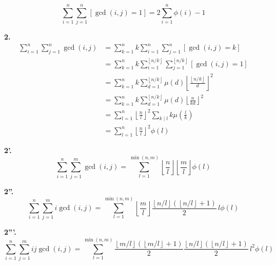 \[
\sum_{i=1}^{n} \sum_{j=1}^{n} [\gcd(i,j)=1]
=
2\sum_{i=1}^{n}\phi(i)-1
\]

\noindent \textbf{2.}
\begin{align*}
\sum_{i=1}^{n} \sum_{j=1}^{n} \gcd(i,j)
&=
\sum_{k=1}^{n}
k
\sum_{i=1}^{n}
\sum_{j=1}^{n}
[\gcd(i,j)=k] \\
&=
\sum_{k=1}^{n}
k
\sum_{i=1}^{\left\lfloor n/k \right\rfloor}
\sum_{j=1}^{\left\lfloor n/k \right\rfloor}
[\gcd(i,j)=1] \\
&=
\sum_{k=1}^{n}
k
\sum_{d=1}^{\left\lfloor n/k \right\rfloor}
\mu(d)
\left\lfloor
\frac{\left\lfloor n/k \right\rfloor}{d}
\right\rfloor^2 \\
&=
\sum_{k=1}^{n}
k
\sum_{d=1}^{\left\lfloor n/k \right\rfloor}
\mu(d)
\left\lfloor
\frac{n}{kd}
\right\rfloor^2 \\
&=
\sum_{l=1}^{n}
\left\lfloor
\frac{n}{l}
\right\rfloor^2
\sum_{k \mid l}
k\mu\left(\frac{l}{k}\right) \\
&=
\sum_{l=1}^{n}
\left\lfloor
\frac{n}{l}
\right\rfloor^2
\phi(l)
\end{align*}

\noindent \textbf{2'.}
\[
\sum_{i=1}^{n} \sum_{j=1}^{m} \gcd(i,j)
=
\sum_{l=1}^{\min(n,m)}
\left\lfloor \frac{n}{l} \right\rfloor
\left\lfloor \frac{m}{l} \right\rfloor
\phi(l)
\]

\noindent \textbf{2''.}
\[
\sum_{i=1}^{n} \sum_{j=1}^{m} i\gcd(i,j)
=
\sum_{l=1}^{\min(n,m)}
\left\lfloor \frac{m}{l} \right\rfloor
\frac{
\left\lfloor n/l \right\rfloor
\left(\left\lfloor n/l \right\rfloor+1\right)
}{2}
\, l\phi(l)
\]

\noindent \textbf{2'''.}
\[
\sum_{i=1}^{n} \sum_{j=1}^{m} ij\gcd(i,j)
=
\sum_{l=1}^{\min(n,m)}
\frac{
\left\lfloor m/l \right\rfloor
\left(\left\lfloor m/l \right\rfloor+1\right)
}{2}
\frac{
\left\lfloor n/l \right\rfloor
\left(\left\lfloor n/l \right\rfloor+1\right)
}{2}
\, l^2\phi(l)
\]

